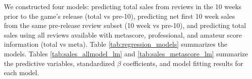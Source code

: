 \documentclass[letterpaper]{article}
\begin{document}
We constructed four models: predicting total sales from reviews in the 10 weeks prior to the game's release (total vs pre-10), predicting net first 10 week sales from the same pre-release review subset (10 week vs pre-10), and predicting total sales using all reviews available with metascore, professional, and amateur score information (total vs meta). Table \ref{tab:regression_models} summarizes the models. Tables \ref{tab:sales_allmodel_lm} and \ref{tab:sales_metascore_lm} summarize the predictive variables, standardized $\beta$ coefficients, and model fitting results for each model.
\end{document}
